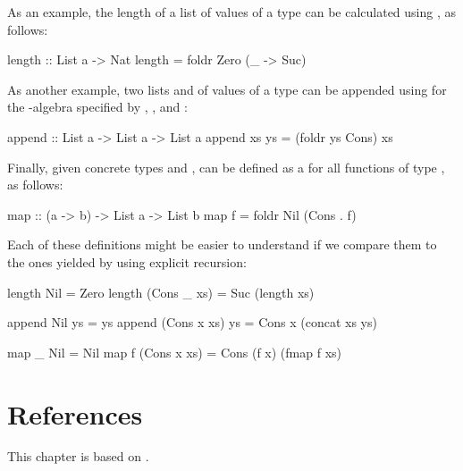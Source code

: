 \begin{example}
  As an example, the length of a list of values of a type
   can be calculated using , as
  follows:
  \begin{codehaskell}
length :: List a -> Nat
length = foldr Zero (\_ -> Suc)
  \end{codehaskell}
  As another example, two lists  and 
  of values of a type  can be appended using
   for the -algebra specified by
  , , and :
  \begin{codehaskell}
append :: List a -> List a -> List a
append xs ys = (foldr ys Cons) xs
  \end{codehaskell}
  Finally, given concrete types  and ,
   can be defined as a  for all
  functions  of type , as follows:
  \begin{codehaskell}
map :: (a -> b) -> List a -> List b
map f = foldr Nil (Cons . f)
  \end{codehaskell}
  Each of these definitions might be easier to understand if we
  compare them to the ones yielded by using explicit recursion:
  \begin{codehaskell}
length Nil         = Zero
length (Cons _ xs) = Suc (length xs)

append Nil         ys = ys
append (Cons x xs) ys = Cons x (concat xs ys)

map _ Nil         = Nil
map f (Cons x xs) = Cons (f x) (fmap f xs)
  \end{codehaskell}

\end{example}

\section{References}
\label{sec:algebras-references}

This chapter is based on \parencite[§ 2.1]{vene-2000}.

\clearemptydoublepage
